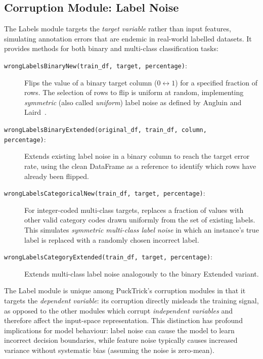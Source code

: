 \subsection{Corruption Module: Label Noise}
\label{sec:pucktrick-labels}

The Labels module targets the \emph{target variable} rather than input features,
simulating annotation errors that are endemic in real-world labelled datasets.
It provides methods for both binary and multi-class classification tasks:

\begin{description}
    \item[\texttt{wrongLabelsBinaryNew(train\_df, target, percentage)}:]
        Flips the value of a binary target column ($0 \leftrightarrow 1$) for
        a specified fraction of rows.  The selection of rows to flip is uniform
        at random, implementing \emph{symmetric} (also called \emph{uniform})
        label noise as defined by Angluin and Laird~\cite{angluin1988learning}.

    \item[\texttt{wrongLabelsBinaryExtended(original\_df, train\_df, column,}]
    \item[\texttt{percentage)}:]
        Extends existing label noise in a binary column to reach the target
        error rate, using the clean DataFrame as a reference to identify which
        rows have already been flipped.

    \item[\texttt{wrongLabelsCategoricalNew(train\_df, target, percentage)}:]
        For integer-coded multi-class targets, replaces a fraction of values
        with other valid category codes drawn uniformly from the set of
        existing labels.  This simulates \emph{symmetric multi-class label
        noise} in which an instance's true label is replaced with a randomly
        chosen incorrect label.

    \item[\texttt{wrongLabelsCategoryExtended(train\_df, target, percentage)}:]
        Extends multi-class label noise analogously to the binary Extended
        variant.
\end{description}

The Label module is unique among PuckTrick's corruption modules in that it
targets the \emph{dependent variable}: its corruption directly misleads the
training signal, as opposed to the other modules which corrupt
\emph{independent variables} and therefore affect the input-space
representation.  This distinction has profound implications for model behaviour:
label noise can cause the model to learn incorrect decision boundaries, while
feature noise typically causes increased variance without systematic bias
(assuming the noise is zero-mean).

